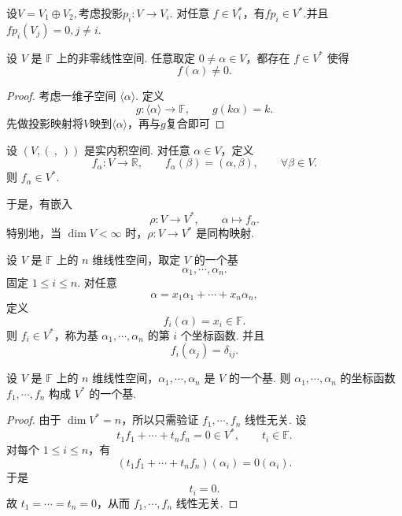 \begin{example}
	设$V=V_1\oplus V_2,$考虑投影$p_i:V\longrightarrow V_i.$
	对任意 $f\in V_i^*$，有$fp_i\in V^*.$并且$fp_i(V_j)=0, j\neq i.$
\end{example}

\begin{example}
	设 $V$ 是 $\mathbb{F}$ 上的非零线性空间. 任意取定 $0\ne \alpha\in V$，都存在 $f\in V^*$ 使得
	\[
	f(\alpha)\ne0.
	\]
\end{example}

\begin{proof}
	考虑一维子空间 $\langle\alpha\rangle$. 定义
	\[
	g:\langle\alpha\rangle\longrightarrow \mathbb{F},\qquad g(k\alpha)=k.
	\]
	先做投影映射将$V$映到$\langle \alpha \rangle$，再与$g$复合即可 
\end{proof}

\begin{example}
	设 $(V,(\ ,\ ))$ 是实内积空间. 对任意 $\alpha\in V$，定义
	\[
	f_\alpha:V\longrightarrow \mathbb{R},\qquad f_\alpha(\beta)=(\alpha,\beta),\qquad \forall \beta\in V.
	\]
	则 $f_\alpha\in V^*$.
	
	于是，有嵌入
	\[
	\rho:V\longrightarrow V^*,\qquad \alpha\longmapsto f_\alpha.
	\]
	特别地，当 $\dim V<\infty$ 时，$\rho:V\to V^*$ 是同构映射.
\end{example}



\begin{definition}\label{p1:concept:c7-l108}
		设 $V$ 是 $\mathbb{F}$ 上的 $n$ 维线性空间，取定 $V$ 的一个基
	\[
	\alpha_1,\cdots,\alpha_n.
	\]
	固定 $1\leq i\leq n$. 对任意
	\[
	\alpha=x_1\alpha_1+\cdots+x_n\alpha_n,
	\]
	定义
	\[
	f_i(\alpha)=x_i\in \mathbb{F}.
	\]
	则 $f_i\in V^*$，称为基 $\alpha_1,\cdots,\alpha_n$ 的第 $i$ 个坐标函数. 并且
	\[
	f_i(\alpha_j)=\delta_{ij}.
	\]

\end{definition}

\begin{lemma}
	设 $V$ 是 $\mathbb{F}$ 上的 $n$ 维线性空间，$\alpha_1,\cdots,\alpha_n$ 是 $V$ 的一个基.
	则 $\alpha_1,\cdots,\alpha_n$ 的坐标函数 $f_1,\cdots,f_n$ 构成 $V^*$ 的一个基.
\end{lemma}

\begin{proof}
	由于 $\dim V^*=n$，所以只需验证 $f_1,\cdots,f_n$ 线性无关.
	设
	\[
	t_1f_1+\cdots+t_nf_n=0\in V^*,\qquad t_i\in\mathbb{F}.
	\]
	对每个 $1\leq i\leq n$，有
	\[
	(t_1f_1+\cdots+t_nf_n)(\alpha_i)=0(\alpha_i).
	\]
	于是
	\[
	t_i=0.
	\]
	故 $t_1=\cdots=t_n=0$，从而 $f_1,\cdots,f_n$ 线性无关.
\end{proof}

